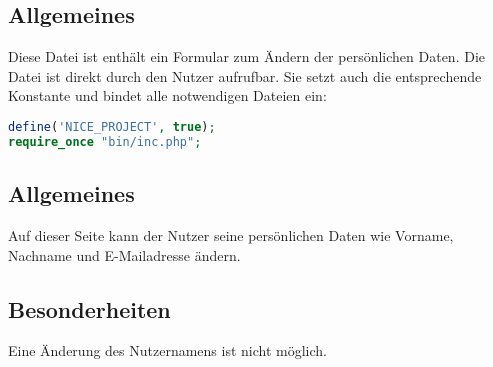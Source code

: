 \subsection{Allgemeines} Diese Datei ist enthält ein Formular zum Ändern der persönlichen Daten.
Die Datei ist direkt durch den Nutzer aufrufbar. Sie setzt auch die entsprechende Konstante und bindet alle notwendigen Dateien ein:
\begin{lstlisting}[language=php]
define('NICE_PROJECT', true);
require_once "bin/inc.php";
\end{lstlisting}
\subsection{Allgemeines}
Auf dieser Seite kann der Nutzer seine persönlichen Daten wie Vorname, Nachname und E-Mailadresse ändern.
\subsection{Besonderheiten}
Eine Änderung des Nutzernamens ist nicht möglich.
